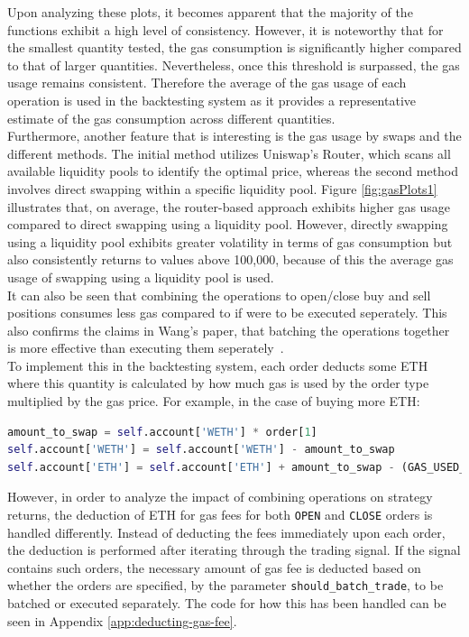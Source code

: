 \noindent Upon analyzing these plots, it becomes apparent that the majority of the functions exhibit a high level of consistency. However, it is noteworthy that for the smallest quantity tested, the gas consumption is significantly higher compared to that of larger quantities. Nevertheless, once this threshold is surpassed, the gas usage remains consistent. Therefore the average of the gas usage of each operation is used in the backtesting system as it provides a representative estimate of the gas consumption across different quantities.
\\[3mm]
Furthermore, another feature that is interesting is the gas usage by swaps and the different methods. The initial method utilizes Uniswap's Router, which scans all available liquidity pools to identify the optimal price, whereas the second method involves direct swapping within a specific liquidity pool. Figure \ref{fig:gasPlots1} illustrates that, on average, the router-based approach exhibits higher gas usage compared to direct swapping using a liquidity pool. However, directly swapping using a liquidity pool exhibits greater volatility in terms of gas consumption but also consistently returns to values above 100,000, because of this the average gas usage of swapping using a liquidity pool is used.
\\[3mm]
It can also be seen that combining the operations to open/close buy and sell positions consumes less gas compared to if were to be executed seperately. This also confirms the claims in Wang's paper, that batching the operations together is more effective than executing them seperately~\cite{wang_cyclic_2022}.
\\[3mm]
To implement this in the backtesting system, each order deducts some ETH where this quantity is calculated by how much gas is used by the order type multiplied by the gas price. For example, in the case of buying more ETH:
\begin{lstlisting}[language=Python]
amount_to_swap = self.account['WETH'] * order[1]
self.account['WETH'] = self.account['WETH'] - amount_to_swap
self.account['ETH'] = self.account['ETH'] + amount_to_swap - (GAS_USED_BY_BUYING_ETH * gas_price_in_eth)
\end{lstlisting}
\vspace{5mm}
\noindent However, in order to analyze the impact of combining operations on strategy returns, the deduction of ETH for gas fees for both \texttt{OPEN} and \texttt{CLOSE} orders is handled differently. Instead of deducting the fees immediately upon each order, the deduction is performed after iterating through the trading signal. If the signal contains such orders, the necessary amount of gas fee is deducted based on whether the orders are specified, by the parameter \texttt{should\_batch\_trade}, to be batched or executed separately. The code for how this has been handled can be seen in Appendix \ref{app:deducting-gas-fee}.

